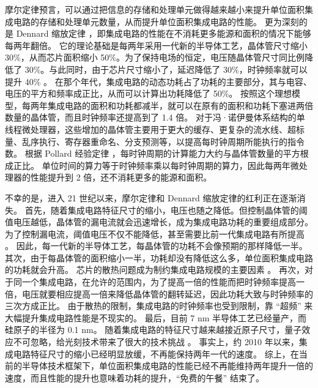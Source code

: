 摩尔定律预言，可以通过把信息的存储和处理单元做得越来越小来提升单位面积集成电路的存储和处理单元数量，从而提升单位面积集成电路的性能。
更为深刻的是 Dennard 缩放定律 \cite{dennard1974design}，即集成电路的性能在不消耗更多能源和面积的情况下能够每两年翻倍。
它的理论基础是每两年采用一代新的半导体工艺，晶体管尺寸缩小 30\%，从而芯片面积缩小 50\%。为了保持电场的恒定，电压随晶体管尺寸同比例降低了 30\%。与此同时，由于芯片尺寸缩小了，延迟降低了 30\%，时钟频率就可以提升 40\% \cite{borkar1999design,borkar2011future}。
在那个年代，集成电路的动态功耗占了功耗的主要部分，其与电容、电压的平方和频率成正比，从而可以计算出功耗降低了 50\%。
按照这个理想模型，每两年集成电路的面积和功耗都减半，就可以在原有的面积和功耗下塞进两倍数量的晶体管，而且时钟频率还提高到了 1.4 倍。
对于冯·诺伊曼体系结构的单线程微处理器，这些增加的晶体管主要用于更大的缓存、更复杂的流水线、超标量、乱序执行、寄存器重命名、分支预测等，以提高每时钟周期所能执行的指令数。
根据 Pollard 经验定律 \cite{pollackpollack}，每时钟周期的计算能力大约与晶体管数量的平方根成正比。
单位时间的算力等于时钟频率乘以每时钟周期的算力，因此每两年微处理器的性能提升到 2 倍，还不消耗更多的能源和面积。

不幸的是，进入 21 世纪以来，摩尔定律和 Dennard 缩放定律的红利正在逐渐消失。
首先，随着集成电路特征尺寸的缩小，电压也随之降低。但控制晶体管的阈值电压越低，晶体管的漏电流就会迅速增长，成为集成电路功耗的重要组成部分。
为了控制漏电流，阈值电压不仅不能降低，甚至需要比前一代集成电路有所提高 \cite{borkar1999design}。
因此，每一代新的半导体工艺，每晶体管的功耗不会像预期的那样降低一半。
其次，由于每晶体管的面积缩小一半，功耗却没有降低这么多，单位面积集成电路的功耗就会升高。
芯片的散热问题成为制约集成电路规模的主要因素 \cite{borkar2011future}。
再次，对于同一个集成电路，在允许的范围内，为了提高一倍的性能而把时钟频率提高一倍，电压就要相应提高一倍来降低晶体管的翻转延迟，因此功耗大致与时钟频率的三次方成正比。
由于散热的限制，集成电路的时钟频率也受到限制，靠 ``超频'' 来大幅提升集成电路性能是不现实的。
最后，目前 7 nm 半导体工艺已经量产，而硅原子的半径为 0.1 nm。
随着集成电路的特征尺寸越来越接近原子尺寸，量子效应不可忽略，给光刻技术带来了很大的技术挑战 \cite{borkar2011future}。
事实上，约 2010 年以来，集成电路特征尺寸的缩小已经明显放缓，不再能保持两年一代的速度。
综上，在当前的半导体技术框架下，单位面积集成电路的性能已经不再能维持两年提升一倍的速度，而且性能的提升也意味着功耗的提升，``免费的午餐'' 结束了。

